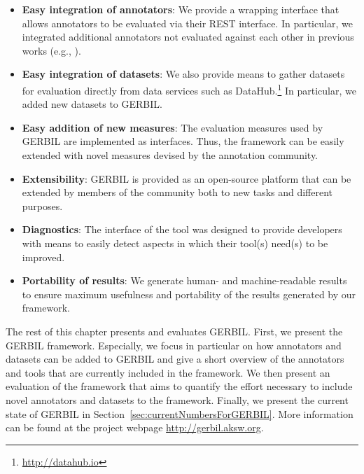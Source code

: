 \begin{itemize}
\item \textbf{Easy integration of annotators}: We provide a wrapping interface that allows annotators to be evaluated via their REST interface. In particular, we integrated \numberOfadditionalAnnotators additional annotators not evaluated against each other in previous works (e.g., \cite{cornolti}).  
\item \textbf{Easy integration of datasets}: We also provide means to gather datasets for evaluation directly from data services such as DataHub.\footnote{\url{http://datahub.io}} In particular, we added \numberOfadditionalDatasets new datasets to GERBIL.
\item \textbf{Easy addition of new measures}: The evaluation measures used by GERBIL are implemented as interfaces. Thus, the framework can be easily extended with novel measures devised by the annotation community.
\item \textbf{Extensibility}: GERBIL is provided as an open-source platform that can be extended by members of the community both to new tasks and different purposes.
\item \textbf{Diagnostics}: The interface of the tool was designed to provide developers with means to easily detect aspects in which their tool(s) need(s) to be improved. 
\item \textbf{Portability of results}: We generate human- and machine-readable results to ensure maximum usefulness and portability of the results generated by our framework. 
\end{itemize}


The rest of this chapter presents and evaluates GERBIL. 
First, we present the GERBIL framework.
Especially, we focus in particular on how annotators and datasets can be added to GERBIL and give a short overview of the annotators and tools that are currently included in the framework. 
We then present an evaluation of the framework that aims to quantify the effort necessary to include novel annotators and datasets to the framework. 
Finally, we present the current state of GERBIL in Section~\ref{sec:currentNumbersForGERBIL}.
More information can be found at the project webpage \url{http://gerbil.aksw.org}. %


